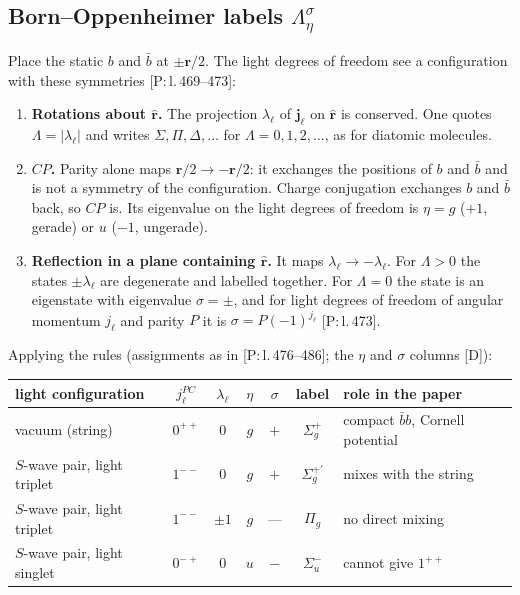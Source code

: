 \documentclass[11pt,a4paper]{article}
\newcommand{\tagP}[1]{\textcolor{blue!65!black}{\textsf{\small[P:\,#1]}}}
\newcommand{\tagD}{\textcolor{orange!85!black}{\textsf{\small[D]}}}
\begin{document}
\subsection{Born--Oppenheimer labels $\Lambda_\eta^\sigma$}
\label{sec:qn-bo}

Place the static $b$ and $\bar b$ at $\pm\bm r/2$. The light degrees of freedom see a configuration with these symmetries \tagP{l.\,469--473}:
\begin{enumerate}
\item \textbf{Rotations about $\hat{\bm r}$.} The projection $\lambda_\ell$ of $\bm j_\ell$ on $\hat{\bm r}$ is conserved. One quotes $\Lambda=|\lambda_\ell|$ and writes $\Sigma,\Pi,\Delta,\dots$ for $\Lambda=0,1,2,\dots$, as for diatomic molecules.
\item \textbf{$CP$.} Parity alone maps $\bm r/2\to-\bm r/2$: it exchanges the positions of $b$ and $\bar b$ and is not a symmetry of the configuration. Charge conjugation exchanges $b$ and $\bar b$ back, so $CP$ is. Its eigenvalue on the light degrees of freedom is $\eta=g$ ($+1$, gerade) or $u$ ($-1$, ungerade).
\item \textbf{Reflection in a plane containing $\hat{\bm r}$.} It maps $\lambda_\ell\to-\lambda_\ell$. For $\Lambda>0$ the states $\pm\lambda_\ell$ are degenerate and labelled together. For $\Lambda=0$ the state is an eigenstate with eigenvalue $\sigma=\pm$, and for light degrees of freedom of angular momentum $j_\ell$ and parity $P$ it is $\sigma=P(-1)^{j_\ell}$ \tagP{l.\,473}.
\end{enumerate}
Applying the rules (assignments as in \tagP{l.\,476--486}; the $\eta$ and $\sigma$ columns \tagD):
\begin{center}
\small
\begin{tabular}{lcccccl}
\toprule
light configuration & $j_\ell^{PC}$ & $\lambda_\ell$ & $\eta$ & $\sigma$ & label & role in the paper\\
\midrule
vacuum (string) & $0^{++}$ & 0 & $g$ & $+$ & $\Sigma_g^+$ & compact $\bar bb$, Cornell potential\\
$S$-wave pair, light triplet & $1^{--}$ & 0 & $g$ & $+$ & $\Sigma_g^{+\prime}$ & mixes with the string\\
$S$-wave pair, light triplet & $1^{--}$ & $\pm1$ & $g$ & --- & $\Pi_g$ & no direct mixing\\
$S$-wave pair, light singlet & $0^{-+}$ & 0 & $u$ & $-$ & $\Sigma_u^-$ & cannot give $1^{++}$\\
\bottomrule
\end{tabular}
\end{center}
\end{document}
